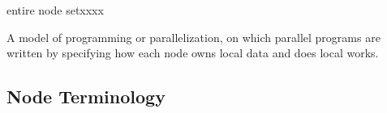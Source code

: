 \begin{namelist}{entire node setxxxx}

 A model of programming or parallelization, on which parallel programs
 are written by specifying how each node owns local data and does local
 works.


%

\end{namelist}


\subsection{Node Terminology}

